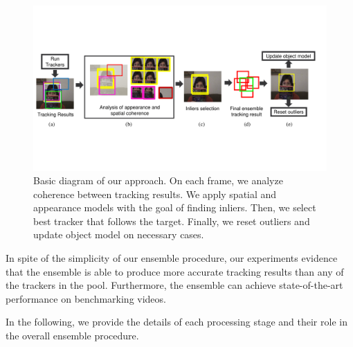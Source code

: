 \begin{figure}[t!]
\centering
\includegraphics[width=1\linewidth, trim= 0cm 5.1cm 1.3cm 5.3cm, clip=true]{Figures/diagram}
\caption [Proposed methodology.]
    {\small Basic diagram of our approach. On each frame, we analyze coherence
        between tracking results. We apply spatial and appearance models with
        the goal of finding inliers. Then, we select best tracker that follows
        the target. Finally, we reset outliers and  update object model on
        necessary cases.
}
\label{fig::diagram}
\end{figure}


In spite of the simplicity of our ensemble procedure, our experiments
evidence that the ensemble is able to produce more accurate tracking results
than any of the trackers in the pool. Furthermore, the ensemble can
achieve state-of-the-art performance on benchmarking videos.

In the following, we provide the details of each processing stage and their
role in the overall ensemble procedure.


